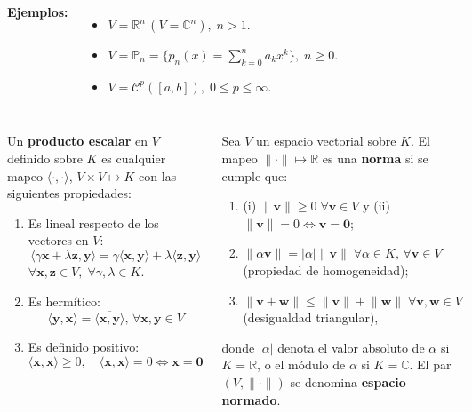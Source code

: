 \documentclass[9pt, aspectratio=169]{beamer}
\begin{document}
\begin{frame}
\begin{columns}[t]
    \textbf{Ejemplos:}
    \begin{itemize}
        \item $V = \mathbb{R}^n \, (V = \mathbb{C}^n), \; n > 1$.
        \item $V = \mathbb{P}_n = \{ p_n(x) = \sum_{k=0}^n a_k x^k \}, \; n \geq 0$.
        \item $V = \mathcal{C}^p([a, b]), \; 0 \leq p \leq \infty$.
    \end{itemize}
    \end{columns}
    \end{frame}

\begin{frame}
\begin{columns}[t]
\cx
\begin{definition}
    Un \textbf{producto escalar} en $V$ definido sobre $K$ es cualquier mapeo $\langle \cdot, \cdot \rangle$, $V \times V \mapsto K$ con las siguientes propiedades:
\begin{enumerate}
    \item Es lineal respecto de los vectores en $V$:
        \[ \langle \gamma \bm{x} + \lambda \bm{z}, \bm{y} \rangle = \gamma \langle \bm{x}, \bm{y} \rangle + \lambda \langle \bm{z}, \bm{y} \rangle \]
        $\forall \bm{x}, \bm{z} \in V, \; \forall \gamma, \lambda \in K$.
    \item Es hermítico:
        \[ \langle \bm{y},\bm{x} \rangle = \overline{ \langle \bm{x}, \bm{y} \rangle }, \, \forall \bm{x}, \bm{y} \in V \]
    \item Es definido positivo:
        \[ \langle \bm{x}, \bm{x} \rangle \geq 0, \quad \langle \bm{x}, \bm{x} \rangle = 0 \Leftrightarrow \bm{x} = \bm{0} \]
\end{enumerate}
\end{definition} \pause


\cx
\begin{definition}
    Sea $V$ un espacio vectorial sobre $K$. El mapeo $\lVert \cdot \rVert \mapsto \mathbb{R}$ es una \textbf{norma} si se cumple que:
    \begin{enumerate}
        \item (i) $\lVert \bm{v} \rVert \geq 0 \; \forall \bm{v} \in V$ y (ii) $\lVert \bm{v} \rVert = 0 \Leftrightarrow \bm{v} = \bm{0}$;
        \item $\lVert \alpha \bm{v} \rVert = |\alpha| \lVert \bm{v} \rVert \; \forall \alpha \in K , \, \forall \bm{v} \in V$ (propiedad de homogeneidad);
        \item $\lVert \bm{v} + \bm{w} \rVert \leq \lVert \bm{v} \rVert + \lVert \bm{w} \rVert \; \forall \bm{v}, \bm{w} \in V$ (desigualdad triangular),
    \end{enumerate}
    donde $|\alpha|$ denota el valor absoluto de $\alpha$ si $K = \mathbb{R}$, o el módulo de $\alpha$ si $K = \mathbb{C}$. El par $(V, \lVert \cdot \rVert)$ se denomina \textbf{espacio normado}.
\end{definition}
\end{columns}
\end{frame}
\end{document}
